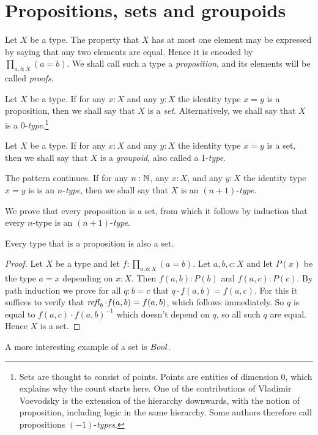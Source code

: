 \section{Propositions, sets and groupoids}
\label{sec:props-sets-grpds}

Let $X$ be a type.  The property that $X$ has at most one element may be expressed by saying that any two elements are equal. Hence it is encoded
by $\prod_{a,b:X} (a=b)$.  We shall call such a type a \emph{proposition}, and its elements will be called \emph{proofs}.

Let $X$ be a type.  If for any $x:X$ and any $y:X$ the identity type $x=y$ is a proposition, then we shall say that $X$ is a \emph{set}.
Alternatively, we shall say that $X$ is a 0-\emph{type}.\footnote{%
Sets are thought to consist of points. Points are entities of dimension 0, 
which explains why the count starts here.
One of the contributions of Vladimir Voevodsky is the extension of
the hierarchy downwards, with the notion of proposition,
including logic in the same hierarchy.
Some authors therefore call propositions $(-1)$-\emph{types}.} 

Let $X$ be a type.  If for any $x:X$ and any $y:X$ the identity type $x=y$ is a set, 
 then we shall say that $X$ is a \emph{groupoid}, also called a 1-\emph{type}.

The pattern continues.  If for any $n:\mathbb{N}$, any $x:X$, and any $y:X$ 
the identity type $x=y$ is is an $n$-\emph{type}, 
then we shall say that $X$ is an $(n+1)$-\emph{type}.

We prove that every proposition is a set, from which it follows
by induction that every $n$-type is an $(n+1)$-\emph{type}.

\begin{lemma}\label{lem:prop-is-set}
Every type that is a proposition is also a set.
\end{lemma}
\begin{proof}
Let $X$ be a type and let $f: \prod_{a,b:X} (a=b)$. Let $a,b,c : X$ and
let $P(x)$ be the type $a=x$ depending on $x:X$. Then
$f(a,b):P(b)$ and $f(a,c):P(c)$. By path induction we prove for
all $q:b=c$ that $q\cdot f(a,b) = f(a,c)$. For this it suffices to
verify that $\mathop{{\it refl}_{b}} \cdot f(a,b) = f(a,b)$, which follows immediately.
So $q$ is equal to $f(a,c)\cdot f(a,b)^{-1}$ which doesn't
depend on $q$, so all such $q$ are equal. Hence $X$ is a set.
\end{proof}

A more interesting example of a set is $\mathop{\mathit{Bool}}$.


